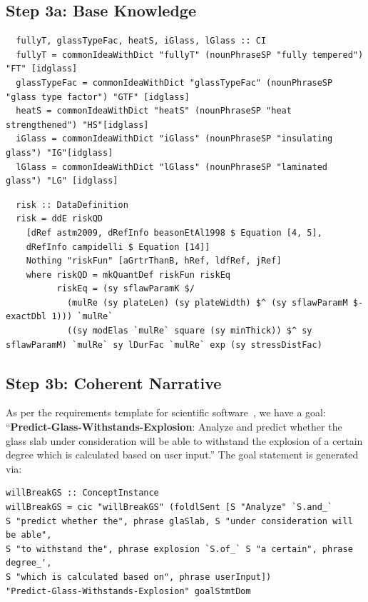 \documentclass[sigconf,review]{acmart}
\begin{document}
\subsection*{Step 3a: Base Knowledge}

\begin{lstlisting}
  fullyT, glassTypeFac, heatS, iGlass, lGlass :: CI
  fullyT = commonIdeaWithDict "fullyT" (nounPhraseSP "fully tempered") "FT" [idglass]
  glassTypeFac = commonIdeaWithDict "glassTypeFac" (nounPhraseSP "glass type factor") "GTF" [idglass]
  heatS = commonIdeaWithDict "heatS" (nounPhraseSP "heat strengthened") "HS"[idglass]
  iGlass = commonIdeaWithDict "iGlass" (nounPhraseSP "insulating glass") "IG"[idglass]
  lGlass = commonIdeaWithDict "lGlass" (nounPhraseSP "laminated glass") "LG" [idglass]
\end{lstlisting}

\begin{lstlisting}
  risk :: DataDefinition
  risk = ddE riskQD
    [dRef astm2009, dRefInfo beasonEtAl1998 $ Equation [4, 5],
    dRefInfo campidelli $ Equation [14]]
    Nothing "riskFun" [aGrtrThanB, hRef, ldfRef, jRef]
    where riskQD = mkQuantDef riskFun riskEq
          riskEq = (sy sflawParamK $/
            (mulRe (sy plateLen) (sy plateWidth) $^ (sy sflawParamM $- exactDbl 1))) `mulRe`
            ((sy modElas `mulRe` square (sy minThick)) $^ sy sflawParamM) `mulRe` sy lDurFac `mulRe` exp (sy stressDistFac)
\end{lstlisting}

\subsection*{Step 3b: Coherent Narrative}

As per the requirements template for scientific software~\cite{SmithAndLai2005,
SmithEtAl2007}, we have a goal: ``\textbf{Predict-Glass-Withstands-Explosion}: Analyze and predict whether the glass slab
under consideration will be able to withstand the explosion of a certain degree
which is calculated based on user input.'' The goal statement is generated via:

\begin{lstlisting}
willBreakGS :: ConceptInstance
willBreakGS = cic "willBreakGS" (foldlSent [S "Analyze" `S.and_`
S "predict whether the", phrase glaSlab, S "under consideration will be able",
S "to withstand the", phrase explosion `S.of_` S "a certain", phrase degree_',
S "which is calculated based on", phrase userInput])
"Predict-Glass-Withstands-Explosion" goalStmtDom
\end{lstlisting}
\end{document}
